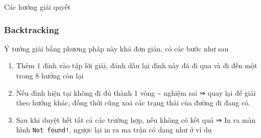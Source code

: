 \documentclass[
]{article}
\providecommand{\tightlist}{%
  \setlength{\itemsep}{0pt}\setlength{\parskip}{0pt}}
\begin{document}
Các hướng giải quyết

\hypertarget{backtracking}{%
\subsubsection{Backtracking}\label{backtracking}}

Ý tưởng giải bằng phương pháp này khá đơn giản, có các bước như sau

\begin{enumerate}
\def\labelenumi{\arabic{enumi}.}
\tightlist
\item
  Thêm 1 đỉnh vào tập lời giải, đánh dấu lại đỉnh này đã đi qua và đi
  đến một trong 8 hướng còn lại
\item
  Nếu đỉnh hiện tại không đi đủ thành 1 vòng \textasciitilde{} nghiệm
  sai ⇒ quay lại để giải theo hướng khác, đồng thời cũng xoá các trạng
  thái của đường đi đang có.
\item
  Sau khi duyệt hết tất cả các trường hợp, nếu không có kết quả ⇒ In ra
  màn hình \texttt{Not\ found!}, ngược lại in ra ma trận có dạng như ở
  ví dụ
\end{enumerate}
\end{document}
